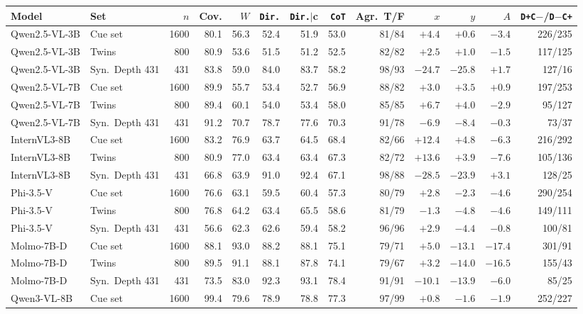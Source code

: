 \begin{tabular}{llrrrrrrrrrrr}
\toprule
Model & Set & $n$ & Cov. & $W$ & \texttt{Dir.} & \texttt{Dir.}$|$c & \texttt{CoT} & Agr.\ T/F & $x$ & $y$ & $A$ & \texttt{D+C$-$}/\texttt{D$-$C+} \\
\midrule
Qwen2.5-VL-3B & Cue set & 1600 & 80.1 & 56.3 & 52.4 & 51.9 & 53.0 & 81/84 & $+4.4$ & $+0.6$ & $-3.4$ & 226/235 \\
Qwen2.5-VL-3B & Twins & 800 & 80.9 & 53.6 & 51.5 & 51.2 & 52.5 & 82/82 & $+2.5$ & $+1.0$ & $-1.5$ & 117/125 \\
Qwen2.5-VL-3B & Syn.\ Depth 431 & 431 & 83.8 & 59.0 & 84.0 & 83.7 & 58.2 & 98/93 & $-24.7$ & $-25.8$ & $+1.7$ & 127/16 \\
Qwen2.5-VL-7B & Cue set & 1600 & 89.9 & 55.7 & 53.4 & 52.7 & 56.9 & 88/82 & $+3.0$ & $+3.5$ & $+0.9$ & 197/253 \\
Qwen2.5-VL-7B & Twins & 800 & 89.4 & 60.1 & 54.0 & 53.4 & 58.0 & 85/85 & $+6.7$ & $+4.0$ & $-2.9$ & 95/127 \\
Qwen2.5-VL-7B & Syn.\ Depth 431 & 431 & 91.2 & 70.7 & 78.7 & 77.6 & 70.3 & 91/78 & $-6.9$ & $-8.4$ & $-0.3$ & 73/37 \\
InternVL3-8B & Cue set & 1600 & 83.2 & 76.9 & 63.7 & 64.5 & 68.4 & 82/66 & $+12.4$ & $+4.8$ & $-6.3$ & 216/292 \\
InternVL3-8B & Twins & 800 & 80.9 & 77.0 & 63.4 & 63.4 & 67.3 & 82/72 & $+13.6$ & $+3.9$ & $-7.6$ & 105/136 \\
InternVL3-8B & Syn.\ Depth 431 & 431 & 66.8 & 63.9 & 91.0 & 92.4 & 67.1 & 98/88 & $-28.5$ & $-23.9$ & $+3.1$ & 128/25 \\
Phi-3.5-V & Cue set & 1600 & 76.6 & 63.1 & 59.5 & 60.4 & 57.3 & 80/79 & $+2.8$ & $-2.3$ & $-4.6$ & 290/254 \\
Phi-3.5-V & Twins & 800 & 76.8 & 64.2 & 63.4 & 65.5 & 58.6 & 81/79 & $-1.3$ & $-4.8$ & $-4.6$ & 149/111 \\
Phi-3.5-V & Syn.\ Depth 431 & 431 & 56.6 & 62.3 & 62.6 & 59.4 & 58.2 & 96/96 & $+2.9$ & $-4.4$ & $-0.8$ & 100/81 \\
Molmo-7B-D & Cue set & 1600 & 88.1 & 93.0 & 88.2 & 88.1 & 75.1 & 79/71 & $+5.0$ & $-13.1$ & $-17.4$ & 301/91 \\
Molmo-7B-D & Twins & 800 & 89.5 & 91.1 & 88.1 & 87.8 & 74.1 & 79/67 & $+3.2$ & $-14.0$ & $-16.5$ & 155/43 \\
Molmo-7B-D & Syn.\ Depth 431 & 431 & 73.5 & 83.0 & 92.3 & 93.1 & 78.4 & 91/91 & $-10.1$ & $-13.9$ & $-6.0$ & 85/25 \\
Qwen3-VL-8B & Cue set & 1600 & 99.4 & 79.6 & 78.9 & 78.8 & 77.3 & 97/99 & $+0.8$ & $-1.6$ & $-1.9$ & 252/227 \\

\end{tabular}
